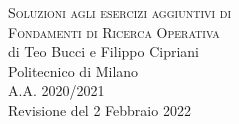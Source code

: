 \documentclass[10pt,a4paper,twoside,openright]{book}
\newcounter{es}
\numberwithin{es}{chapter}
\begin{document}

\frontmatter
\pagestyle{empty} %
\vspace*{\fill}
\begin{center}
	{\large \textsc{Soluzioni agli esercizi aggiuntivi di}}\\
	\vspace*{0.4cm}
	{\Huge \textsc{Fondamenti di Ricerca Operativa}}\\
	\vspace*{1cm}
	{\large {di Teo Bucci e Filippo Cipriani}}\\
	\vspace*{1cm}
	Politecnico di Milano\\A.A. 2020/2021\\
	\vspace*{1cm}
	Revisione del 2 Febbraio 2022
\end{center}
\vspace*{\fill}
\newpage


%
%
%
%
%



\newpage


\tableofcontents


\end{document}

